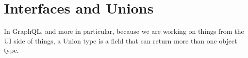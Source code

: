 \maketitle{}
\section{ Interfaces and Unions }

In GraphQL, and more in particular, because we are working on things from the
UI side of things, a Union type is a field that can return more than one object
type. 
